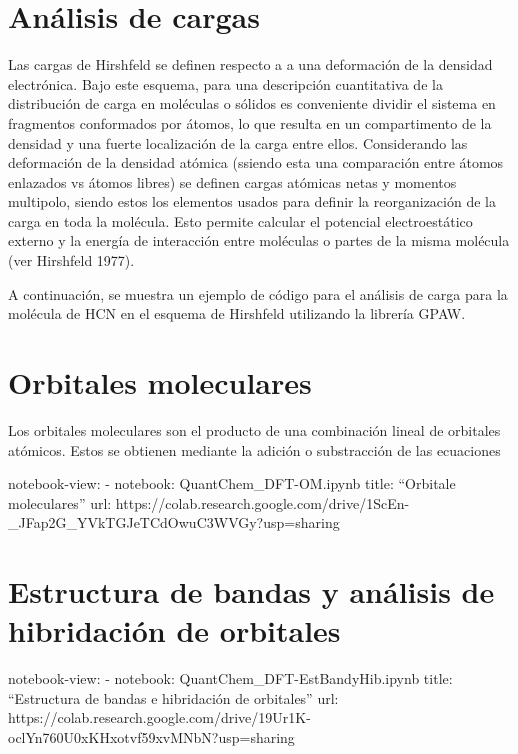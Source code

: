 \documentclass[
  letterpaper,
  DIV=11,
  numbers=noendperiod]{scrreprt}
\begin{document}
\hypertarget{anuxe1lisis-de-cargas}{%
\section{Análisis de cargas}\label{anuxe1lisis-de-cargas}}

Las cargas de Hirshfeld se definen respecto a a una deformación de la
densidad electrónica. Bajo este esquema, para una descripción
cuantitativa de la distribución de carga en moléculas o sólidos es
conveniente dividir el sistema en fragmentos conformados por átomos, lo
que resulta en un compartimento de la densidad y una fuerte localización
de la carga entre ellos. Considerando las deformación de la densidad
atómica (ssiendo esta una comparación entre átomos enlazados vs átomos
libres) se definen cargas atómicas netas y momentos multipolo, siendo
estos los elementos usados para definir la reorganización de la carga en
toda la molécula. Esto permite calcular el potencial electroestático
externo y la energía de interacción entre moléculas o partes de la misma
molécula (ver Hirshfeld 1977).

A continuación, se muestra un ejemplo de código para el análisis de
carga para la molécula de HCN en el esquema de Hirshfeld utilizando la
librería GPAW.

\hypertarget{orbitales-moleculares}{%
\section{Orbitales moleculares}\label{orbitales-moleculares}}

Los orbitales moleculares son el producto de una combinación lineal de
orbitales atómicos. Estos se obtienen mediante la adición o substracción
de las ecuaciones

notebook-view: - notebook: QuantChem\_DFT-OM.ipynb title: ``Orbitale
moleculares'' url:
https://colab.research.google.com/drive/1ScEn-\_JFap2G\_YVkTGJeTCdOwuC3WVGy?usp=sharing

\hypertarget{estructura-de-bandas-y-anuxe1lisis-de-hibridaciuxf3n-de-orbitales}{%
\section{Estructura de bandas y análisis de hibridación de
orbitales}\label{estructura-de-bandas-y-anuxe1lisis-de-hibridaciuxf3n-de-orbitales}}

notebook-view: - notebook: QuantChem\_DFT-EstBandyHib.ipynb title:
``Estructura de bandas e hibridación de orbitales'' url:
https://colab.research.google.com/drive/19Ur1K-oclYn760U0xKHxotvf59xvMNbN?usp=sharing
\end{document}
